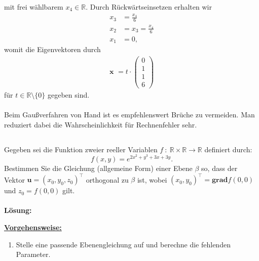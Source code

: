 mit frei wählbarem $x_4 \in \mathbb{R}$.
Durch Rückwärtseinsetzen erhalten wir
\begin{align*}
x_3 &= \frac{x_4}{6}\\
x_2 &=  x_3 =  \frac{x_4}{6}\\
x_1 &= 0,
\end{align*}
womit die Eigenvektoren durch
\begin{align*}
\textbf{x }  = t \cdot 
\begin{pmatrix}
0 \\
1 \\ 
1 \\
6
\end{pmatrix}
\end{align*}
für $t \in \mathbb{R} \setminus \lbrace 0 \rbrace$ gegeben sind.\\
\\
Beim Gaußverfahren von Hand ist es empfehlenswert Brüche zu vermeiden.
Man reduziert dabei die Wahrscheinlichkeit für Rechnenfehler sehr.

\newpage

\subsection*{}
Gegeben sei die Funktion zweier reeller Variablen 
$f \ : \ \mathbb{R}\times \mathbb{R} \to \mathbb{R}$ definiert durch:
\begin{equation*}
f(x,y) = e^{2x^2+y^3 +3x +3y}.
\end{equation*}
Bestimmen Sie die Gleichung (allgemeine Form) einer Ebene $\beta$ so,
dass der Vektor $\textbf{u} = (x_0,y_0,z_0)^\top$ orthogonal zu $\beta$ ist,
wobei $(x_0,y_0)^\top = \textbf{grad} f(0,0)$ und $z_0 = f(0,0)$ gilt.
\\
\\
\textbf{Lösung:}
\begin{mdframed}
\underline{\textbf{Vorgehensweise:}}
\renewcommand{\labelenumi}{\theenumi.}
\begin{enumerate}
\item Stelle eine passende Ebenengleichung auf und berechne die fehlenden Parameter.
\end{enumerate}
\end{mdframed}

